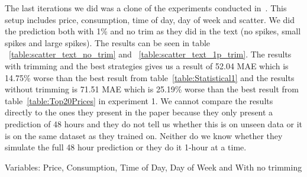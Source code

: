 The last iterations we did was a clone of the experiments conducted in~\cite{singhal2011electricity}. This setup includes price, consumption, time of day, day of week and scatter. We did the prediction both with 1\% and no trim as they did in the text (no spikes, small spikes and large spikes). The results can be seen in table ~\ref{table:scatter_text_no_trim} and ~\ref{table:scatter_text_1p_trim}. The results with trimming and the best strategies gives us a result of 52.04 MAE which is 14.75\% worse than the best result from table~\ref{table:Statistical1} and the results without trimming is 71.51 MAE which is 25.19\% worse than the best result from table~\ref{table:Top20Prices} in experiment 1. We cannot compare the results directly to the ones they present in the paper because they only present a prediction of 48 hours and they do not tell us whether this is on unseen data or it is on the same dataset as they trained on. Neither do we know whether they simulate the full 48 hour prediction or they do it 1-hour at a time.

Variables: Price, Consumption, Time of Day, Day of Week and With no trimming
\begin{table}[H]
\centering  %
\caption{Scatter text~\cite{singhal2011electricity} with other statistical features and no trim} %
\label{table:scatter_text_no_trim} %
\end{table}

